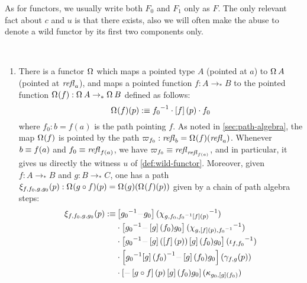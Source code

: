 \documentclass[english,a4]{article}
\renewcommand{\ap}[1]{\left[{#1}\right]}
\newcommand{\ptdto}{\to_\ast}%
\begin{document}
As for functors, we usually write both $F_0$ and $ F_1$ only as $F$. The only
relevant fact about $c$ and $u$ is that there exists, also we will often make
the abuse to denote a wild functor by its first two components only.

\begin{example}~
  \begin{enumerate}
    \item There is a functor $\loopspace \null$ which maps a pointed type $A$
      (pointed at $a$) to $\loopspace \null A$ (pointed at $\mathop{{\mathit{refl}}_{a}}$), and maps
      a pointed function $f: A \ptdto B$ to the pointed function $\loopspace
      \null (f): \loopspace \null A \ptdto \loopspace \null B$ defined as
      follows:
      \begin{displaymath}
        \loopspace \null (f) (p) \defequi \inv{f_0} \cdot \ap f (p) \cdot f_0
      \end{displaymath}
      where $f_0: b=f(a)$ is the path pointing $f$. As noted in
      \cref{sec:path-algebra}, the map $\loopspace \null (f)$ is pointed by the
      path $\varpi_{f_0}:\refl b = \loopspace\null (f)(\refl a)$.
      Whenever $b \equiv f(a)$ and $f_0 \equiv \mathop{{\mathit{refl}}_{f(a)}}$, we have
      $\varpi_{f_0} \equiv \mathop{{\mathit{refl}}_{\mathop{{\mathit{refl}}_{f(a)}}}}$, and in particular, it gives us
      directly the witness $u$ of \cref{def:wild-functor}.
      Moreover, given $f:A \ptdto B$ and $g:B \ptdto C$, one has a path
      $\xi_{f,f_0,g,g_0}(p): \loopspace\null (g\circ f)(p) =
      \loopspace\null(g)(\loopspace\null(f)(p))$ given by a chain of path algebra steps:
      \begin{displaymath}
        \begin{split}
        \xi_{f,f_0,g,g_0}(p) \defequi&
        \ap{\inv {g_0}  \blank g_0}(\inv{\chi_{g,f_0,\inv{f_0}\ap f(p)}})\\
        &\cdot
        \ap{\inv {g_0}  \blank \ap g(f_0) g_0}(\inv{\chi_{g,\ap f(p),\inv{f_0}}})\\
        &\cdot
        \ap{\inv {g_0}  \blank \ap g (\ap f(p)) \ap g(f_0) g_0}(\inv{\iota_{f,f_0}})\\
        &\cdot
        \ap{\inv {g_0} \inv{\ap g(f_0)} \blank \ap g(f_0) g_0}(\gamma_{f,g}(p))\\
        &\cdot
        \ap { \blank \ap{g\circ f}(p) \ap g(f_0) g_0 } (\kappa_{g_0,\ap g (f_0)})
      \end{split}
      \end{displaymath}
      \begin{displaymath}
        \begin{tikzcd}

\end{tikzcd}
\end{displaymath}
\end{enumerate}
\end{example}
\end{document}
